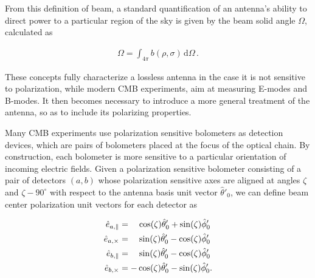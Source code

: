 \documentclass[a4paper,11pt]{article}
\newcommand{\co}{\mathbin{\|}}
\newcommand{\cx}{\mathbin{\times}}
\begin{document}
\noindent
From this definition of beam, a standard quantification of an antenna's ability to direct power to a particular region of the sky is given by the beam solid angle $\Omega$, calculated as

\begin{equation}
\begin{aligned}
\Omega = \int_{4\pi} b(\rho,\sigma) \, \mathrm{d} \Omega \, .
\end{aligned}
\label{eq::omega_def}
\end{equation}

\noindent
These concepts fully characterize a lossless antenna in the case it is not sensitive to polarization, while modern CMB experiments, aim at measuring E-modes and B-modes. It then becomes necessary to introduce a more general treatment of the antenna, so as to include its polarizing properties. 


Many CMB experiments use polarization sensitive bolometers as detection devices, which are pairs of bolometers placed at the focus of the optical chain. By construction, each bolometer is more sensitive to a particular orientation of incoming electric fields. Given a polarization sensitive bolometer consisting of a pair of detectors $(a,b)$ whose polarization sensitive axes are aligned at angles $\zeta$ and $\zeta - 90^{\circ}$ with respect to the antenna basis unit vector $\hat{\theta}'_0$, we can define beam center polarization unit vectors for each detector as

\begin{align}
\hat{e}_{a,{\co}}    &= \quad \cos(\zeta)\hat{\theta}'_0 + \sin(\zeta)\hat{\phi}'_0 \\
\hat{e}_{a,{\cx}}    &= \quad \sin(\zeta)\hat{\theta}'_0 - \cos(\zeta)\hat{\phi}'_0 \\
\hat{e}_{b,{\co}}    &= \quad \sin(\zeta)\hat{\theta}'_0 - \cos(\zeta)\hat{\phi}'_0 \\
\hat{e}_{b,{\cx}}    &= -\cos(\zeta)\hat{\theta}'_0 - \sin(\zeta)\hat{\phi}'_0 \rm{.} 
\label{eq::copol_bolo}
\end{align}


\end{document}
